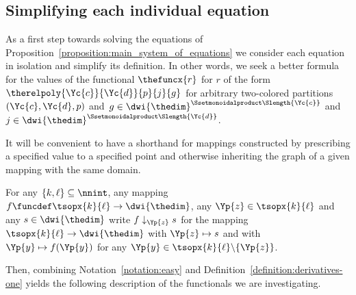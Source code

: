 \documentclass[pdftex]{sigma}
\numberwithin{equation}{section}
\begin{document}
\subsection{Simplifying each individual equation}
\label{section:main-one-simplifications}
{
  \newcommand{\anyrel}{r}
  \newcommand{\thepartition}{p}
  \newcommand{\incol}{\Yc{c}}
  \newcommand{\outcol}{{\Yc{d}}}
  \newcommand{\infree}{g}
  \newcommand{\outfree}{j}
As a first step towards solving the equations of Pro\-po\-si\-tion~\ref{proposition:main_system_of_equations} we consider each equation in isolation  and simplify its  definition. In other words,  we seek a better formula for the values of the functional $\thefuncx{\anyrel}$ for  $\anyrel$ of the form $\therelpoly{\incol}{\outcol}{\thepartition}{\outfree}{\infree}$ for arbitrary two-colored partitions $(\incol,\outcol,\thepartition)$ and~$\infree\in\dwi{\thedim}^{\Ssetmonoidalproduct\Slength{\incol}}$ and $\outfree\in\dwi{\thedim}^{\Ssetmonoidalproduct\Slength{\outcol}}$.
}

It will be convenient to have a shorthand for mappings constructed by prescribing a specified value to a specified point and otherwise inheriting the graph of a given mapping with the same domain.
\begin{Notation}
  \newcommand{\inlen}{k}
  \newcommand{\outlen}{\ell}
  \newcommand{\theind}{f}
  \newcommand{\thepoint}{\Yp{z}}
  \newcommand{\thevalue}{s}
  \newcommand{\thepartition}{p}
  \newcommand{\thealtered}{\theind\downarrow_\thepoint\thevalue}
  \newcommand{\anypoint}{\Yp{y}}
  For any $\{\inlen,\outlen\}\subseteq \nnint$, any mapping $\theind\funcdef\tsopx{\inlen}{\outlen}\to \dwi{\thedim}$, any $\thepoint\in\tsopx{\inlen}{\outlen}$ and any $\thevalue\in\dwi{\thedim}$ write $\thealtered$ for the mapping $\tsopx{\inlen}{\outlen}\to \dwi{\thedim}$ with  $\thepoint\mapsto \thevalue$ and with $\anypoint\mapsto \theind(\anypoint)$ for any $\anypoint\in\tsopx{\inlen}{\outlen}\backslash \{\thepoint\}$.
\end{Notation}
Then, combining Notation~\ref{notation:easy} and Definition~\ref{definition:derivatives-one} yields the following description of the functionals we are investigating.
\end{document}
